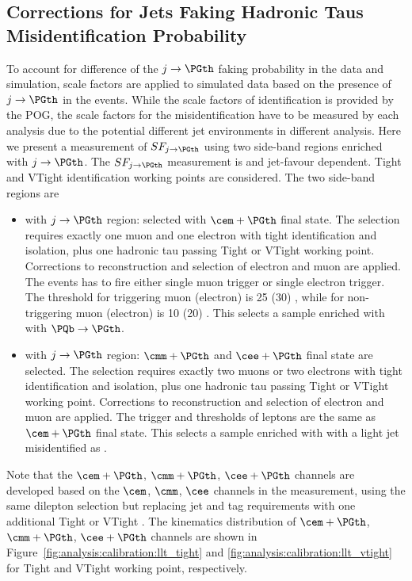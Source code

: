 \FloatBarrier








\subsection{Corrections for Jets Faking Hadronic Taus Misidentification Probability}
\label{sec:analysis:calibration:jetToTauh}

To account for difference of the $j\to\PGth$ faking probability in the data and simulation, scale factors are applied to simulated data based on the presence of $j\to\PGth$ in the events. While the scale factors of \PGth identification is provided by the POG, the scale factors for the misidentification have to be measured by each analysis due to the potential different jet environments in different analysis. Here we present a measurement of $SF_{j\to\PGth}$ using two side-band regions enriched with $j\to\PGth$. The $SF_{j\to\PGth}$ measurement is \pt and jet-favour dependent. Tight and VTight \PGth identification working points are considered. The two side-band regions are
\begin{itemize}
    \item \ttbar with $j\to\PGth$ region: selected with $\cem+\PGth$ final state. The selection requires exactly one muon and one electron with tight identification and isolation, plus one hadronic tau passing Tight or VTight working point. Corrections to reconstruction and selection of electron and muon are applied. The events has to fire either single muon trigger or single electron trigger.  The \pt threshold for triggering muon (electron) is 25 (30) \GeV, while for non-triggering muon (electron) is 10 (20) \GeV.  This selects a sample enriched with \ttbar with $\PQb \to \PGth$. 
    \item \zjets with $j\to\PGth$ region: $\cmm+\PGth$ and $\cee+\PGth$  final state are selected.  The selection requires exactly two muons or two electrons with tight identification and isolation, plus one hadronic tau passing Tight or VTight working point.  Corrections to reconstruction and selection of electron and muon are applied. The trigger and \pt thresholds of leptons are the same as $\cem+\PGth$ final state.  This selects a sample enriched with \zjets with a light jet misidentified as \PGth. 
\end{itemize}
\noindent Note that the $\cem+\PGth$, $\cmm+\PGth$, $\cee+\PGth$ channels are developed based on the $\cem$, $\cmm$, $\cee$ channels in the \BWl measurement, using the same dilepton selection but replacing jet and \PQb tag requirements with one additional Tight or VTight \PGth. The kinematics distribution of $\cem+\PGth$, $\cmm+\PGth$, $\cee+\PGth$ channels are shown in Figure~\ref{fig:analysis:calibration:llt_tight} and \ref{fig:analysis:calibration:llt_vtight} for Tight and VTight working point, respectively. 


